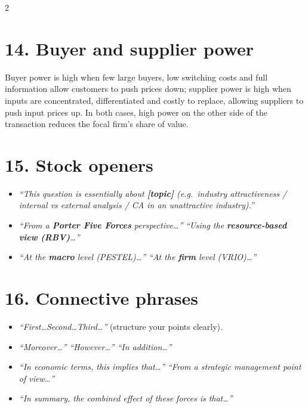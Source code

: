 \documentclass[8pt,landscape,a4paper]{article}
\begin{document}
\begin{multicols}{2}
\section*{\color{eublue}14. Buyer and supplier power}
Buyer power is high when few large buyers, low switching costs and full information allow customers to push prices down; supplier power is high when inputs are concentrated, differentiated and costly to replace, allowing suppliers to push input prices up. In both cases, high power on the other side of the transaction reduces the focal firm's share of value.

\section*{\color{eublue}15. Stock openers}
\begin{itemize}
\item \emph{``This question is essentially about \textbf{[topic]} (e.g.\ industry attractiveness / internal vs external analysis / CA in an unattractive industry).''}
\item \emph{``From a \textbf{Porter Five Forces} perspective\ldots''} \quad \emph{``Using the \textbf{resource-based view (RBV)}\ldots''}
\item \emph{``At the \textbf{macro} level (PESTEL)\ldots''} \quad \emph{``At the \textbf{firm} level (VRIO)\ldots''}
\end{itemize}

\section*{\color{eublue}16. Connective phrases}
\begin{itemize}
\item \emph{``First\ldots Second\ldots Third\ldots''} (structure your points clearly).
\item \emph{``Moreover\ldots''} \quad \emph{``However\ldots''} \quad \emph{``In addition\ldots''}
\item \emph{``In economic terms, this implies that\ldots''} \quad \emph{``From a strategic management point of view\ldots''}
\item \emph{``In summary, the combined effect of these forces is that\ldots''}
\end{itemize}


\end{multicols}
\end{document}
